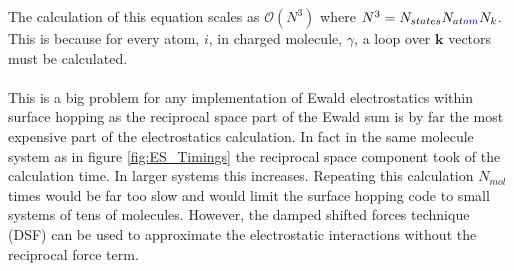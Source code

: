 \noindent The calculation of this equation scales as $\mathcal{O}(N^3)$ where $N^3 = N_{states} N_{at\textcolor{blue}{om}} N_{k}$. This   is because for every atom, $i$, in charged molecule, $\gamma$, a loop over $\mathbf{k}$ vectors must be calculated.   
\\\\
This is a big problem for any implementation of Ewald electrostatics within surface hopping as the reciprocal space part of the Ewald sum is by far the most expensive part of the electrostatics calculation. In fact in the same  molecule system as in figure \ref{fig:ES_Timings} the reciprocal space component took  of the calculation time. In larger systems this increases. Repeating this calculation $N_{mol}$ times would be far too slow and would limit the surface hopping code to small systems of tens of molecules. However, the damped shifted forces technique (DSF) \cite{DSF} can be used to approximate the electrostatic interactions without the reciprocal force term. 

